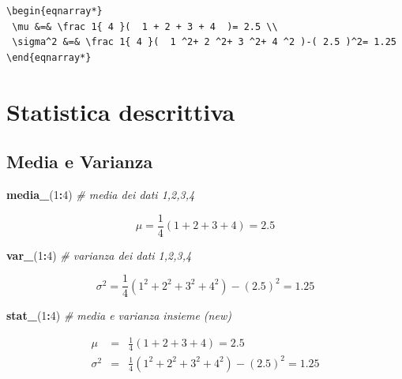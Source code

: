 \documentclass[
  11pt,
]{book}
\newenvironment{Shaded}{\begin{snugshade}}{\end{snugshade}}
\newcommand{\CommentTok}[1]{\textcolor[rgb]{0.56,0.35,0.01}{\textit{#1}}}
\newcommand{\DecValTok}[1]{\textcolor[rgb]{0.00,0.00,0.81}{#1}}
\newcommand{\FunctionTok}[1]{\textcolor[rgb]{0.13,0.29,0.53}{\textbf{#1}}}
\newcommand{\NormalTok}[1]{#1}
\newcommand{\SpecialCharTok}[1]{\textcolor[rgb]{0.81,0.36,0.00}{\textbf{#1}}}
\theoremstyle{mytheoremstyle}
\theoremstyle{mydefstyle}
\begin{document}
\begin{verbatim}
\begin{eqnarray*}
 \mu &=& \frac 1{ 4 }(  1 + 2 + 3 + 4  )= 2.5 \\ 
 \sigma^2 &=& \frac 1{ 4 }(  1 ^2+ 2 ^2+ 3 ^2+ 4 ^2 )-( 2.5 )^2= 1.25 
\end{eqnarray*}
\end{verbatim}

\section{Statistica descrittiva}\label{statistica-descrittiva-1}

\subsection{Media e Varianza}\label{media-e-varianza}

\begin{Shaded}
\begin{Highlighting}[]
\FunctionTok{media\_}\NormalTok{(}\DecValTok{1}\SpecialCharTok{:}\DecValTok{4}\NormalTok{)                     }\CommentTok{\# media dei dati 1,2,3,4}
\end{Highlighting}
\end{Shaded}

\[ \mu =\frac 1{ 4 }( 1+2+3+4 )= 2.5 \]

\begin{Shaded}
\begin{Highlighting}[]
\FunctionTok{var\_}\NormalTok{(}\DecValTok{1}\SpecialCharTok{:}\DecValTok{4}\NormalTok{)                       }\CommentTok{\# varianza dei dati 1,2,3,4}
\end{Highlighting}
\end{Shaded}

\[ \sigma^2 =\frac 1{ 4 }( 1^2+2^2+3^2+4^2 )-( 2.5 )^2= 1.25 \]

\begin{Shaded}
\begin{Highlighting}[]
\FunctionTok{stat\_}\NormalTok{(}\DecValTok{1}\SpecialCharTok{:}\DecValTok{4}\NormalTok{)                      }\CommentTok{\# media e varianza insieme (new)}
\end{Highlighting}
\end{Shaded}

\begin{eqnarray*}
 \mu &=& \frac 1{ 4 }(  1 + 2 + 3 + 4  )= 2.5 \\ 
 \sigma^2 &=& \frac 1{ 4 }(  1 ^2+ 2 ^2+ 3 ^2+ 4 ^2 )-( 2.5 )^2= 1.25 
\end{eqnarray*}
\end{document}
